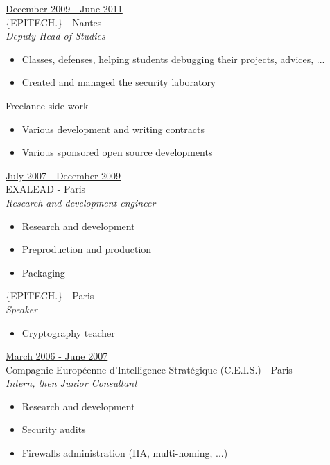 \documentclass[a4paper,10pt]{letter}
\begin{document}
\begin{description}
\item{\underline{December 2009 - June 2011}}\\
  \{EPITECH.\} - Nantes\\
  \textit{Deputy Head of Studies}
  \begin{itemize}
  \item Classes, defenses, helping students debugging their projects, advices, ...
  \item Created and managed the security laboratory\\
  \end{itemize}

  Freelance side work
  \begin{itemize}
  \item Various development and writing contracts
  \item Various sponsored open source developments\\
  \end{itemize}

\item{\underline{July 2007 - December 2009}}\\
  EXALEAD - Paris\\
  \textit{Research and development engineer}
  \begin{itemize}
  \item Research and development 
  \item Preproduction and production
  \item Packaging\\
  \end{itemize}

  \{EPITECH.\} - Paris\\
  \textit{Speaker}
  \begin{itemize}
  \item Cryptography teacher\\
  \end{itemize}

\item{\underline{March 2006 - June 2007}} \\
  Compagnie Europ\'eenne d'Intelligence Strat\'egique (C.E.I.S.) - Paris\\
  \textit{Intern, then Junior Consultant}
  \begin{itemize}
  \item Research and development
  \item Security audits
  \item Firewalls administration (HA, multi-homing, ...)\\
  \end{itemize}
\end{description}
\end{document}
